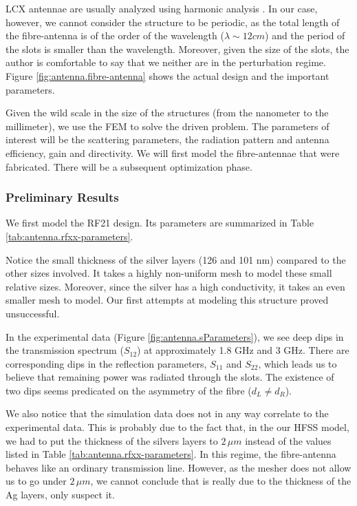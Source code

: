 LCX antennae are usually analyzed using harmonic analysis \cite{WAN2001}. 
In our case, however, we cannot consider the structure to be periodic, as the total 
length of the fibre-antenna is of the order of the wavelength ($\lambda\sim12\unit{cm}$) and the period
of the slots is smaller than the wavelength. Moreover, given the size of the slots, 
the author is comfortable to say that we neither are in the perturbation regime. 
Figure \ref{fig:antenna.fibre-antenna} shows the actual design and the important parameters.

Given the wild scale in the size of the structures (from the nanometer to the millimeter), we use
the FEM to solve the driven problem. The parameters of interest will be the scattering parameters, the
radiation pattern and antenna efficiency, gain and directivity. We will first model the fibre-antennae
that were fabricated. There will be a subsequent optimization phase.

\subsubsection{Preliminary Results}
We first model the RF21 design. Its parameters are summarized in 
Table \ref{tab:antenna.rfxx-parameters}. 

Notice the small thickness
of the silver layers (126 and 101 nm) compared to the other 
sizes involved. It takes a highly non-uniform mesh to model
these small relative sizes. Moreover, since the silver has a high
conductivity, it takes an even smaller mesh to model. Our first 
attempts at modeling this structure proved unsuccessful.

In the experimental data (\see Figure \ref{fig:antenna.sParameters}), 
we see deep dips in the transmission spectrum ($S_{12}$) at approximately
1.8 GHz and 3 GHz. There are corresponding dips in the reflection parameters,
$S_{11}$ and $S_{22}$, which leads us to believe that remaining power 
was radiated through the slots. The existence of two dips seems predicated on the asymmetry
of the fibre ($d_L\neq d_R$). 

We also notice that the simulation data does not in any way correlate
to the experimental data. This is probably due to the fact that, in the our
HFSS model, we had to put the thickness of the silvers layers to $2\,\unit{\mu m}$
instead of the values listed in Table \ref{tab:antenna.rfxx-parameters}. In 
this regime, the fibre-antenna behaves like an ordinary transmission line. 
However, as the mesher does not allow us to go under $2\,\unit{\mu m}$, we cannot
conclude that is really due to the thickness of the Ag layers, only suspect it.

